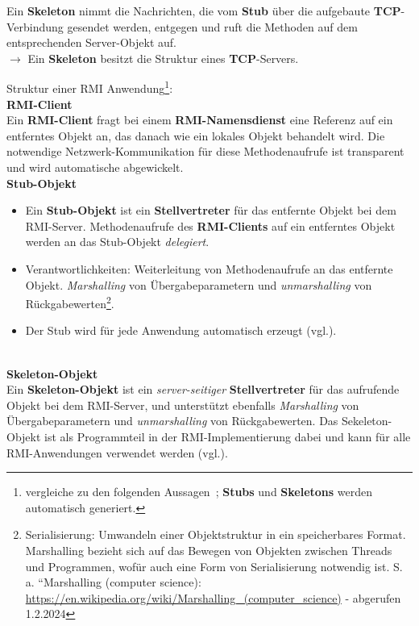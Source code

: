 \noindent
Ein \textbf{Skeleton} nimmt die Nachrichten, die vom \textbf{Stub} über die aufgebaute \textbf{TCP}-Verbindung gesendet werden, entgegen und ruft die Methoden auf dem entsprechenden Server-Objekt auf.\\
$\rightarrow$ Ein \textbf{Skeleton} besitzt die Struktur eines \textbf{TCP}-Servers.



\begin{tcolorbox}[enlarge top by=0.5cm,enlarge bottom by=0.5cm]
    Struktur einer RMI Anwendung\footnote{vergleiche zu den folgenden Aussagen~\cite[162 ff.]{HM05}; \textbf{Stubs} und \textbf{Skeletons} werden automatisch generiert.}:\\


    \noindent
    \textbf{RMI-Client}\\
    Ein \textbf{RMI-Client} fragt bei einem \textbf{RMI-Namensdienst} eine Referenz auf ein entferntes Objekt an, das danach wie ein lokales Objekt behandelt wird.
    Die notwendige Netzwerk-Kommunikation für diese Methodenaufrufe ist transparent und wird automatische abgewickelt.\\


    \noindent
    \textbf{Stub-Objekt}
    \begin{itemize}
        \item Ein \textbf{Stub-Objekt} ist ein \textbf{Stellvertreter} für das entfernte Objekt bei dem RMI-Server.
        Methodenaufrufe des \textbf{RMI-Clients} auf ein entferntes Objekt werden an das Stub-Objekt \textit{delegiert}.
        \item Verantwortlichkeiten: Weiterleitung von Methodenaufrufe an das entfernte Objekt. \textit{Marshalling} von Übergabeparametern und \textit{unmarshalling} von Rückgabewerten\footnote{
          Serialisierung: Umwandeln einer Objektstruktur in ein speicherbares Format. Marshalling bezieht sich auf das Bewegen von Objekten zwischen Threads und Programmen, wofür auch eine Form von Serialisierung notwendig ist. S. a. ``Marshalling (computer science): \url{https://en.wikipedia.org/wiki/Marshalling_(computer_science)} - abgerufen 1.2.2024
        }.
        \item Der Stub wird für jede Anwendung automatisch erzeugt (vgl.\cite[313]{Oec22}).
    \end{itemize}\\

    \noindent
    \textbf{Skeleton-Objekt}\\
   Ein \textbf{Skeleton-Objekt} ist ein \textit{server-seitiger} \textbf{Stellvertreter} für das aufrufende Objekt bei dem RMI-Server, und unterstützt ebenfalls  \textit{Marshalling} von Übergabeparametern und \textit{unmarshalling} von Rückgabewerten. Das Sekeleton-Objekt ist als Programmteil in der RMI-Implementierung dabei und kann für alle RMI-Anwendungen verwendet werden (vgl.\cite[313]{Oec22}).\\


\end{tcolorbox}
